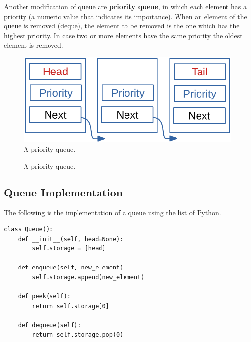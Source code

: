 Another modification of queue are \textbf{priority queue}, in which each element has a priority (a numeric value that indicates its importance). When an element of the queue is removed (deque), the element to be removed is the one which has the highest priority. In case two or more elements have the same priority the oldest element is removed.

\begin{figure}[H]
	\begin{center}
		\includegraphics[scale=.6]{chapters/datastructures/images/queue_3.pdf}
		\caption[A priority queue.]{A priority queue.}
		\label{queue_3}
	\end{center}
\end{figure}

\begin{figure}[H]
\centering
{}
\caption[A priority queue.]{A priority queue.}
\label{queue_3}
\end{figure}

\subsection{Queue Implementation}
The following is the implementation of a queue using the list of Python.
\begin{lstlisting}[firstnumber=1, caption={Queue implementation.}]
class Queue():
	def __init__(self, head=None):
		self.storage = [head]
	
	def enqueue(self, new_element):
		self.storage.append(new_element)
	
	def peek(self):
		return self.storage[0]
	
	def dequeue(self):
		return self.storage.pop(0)
\end{lstlisting}

